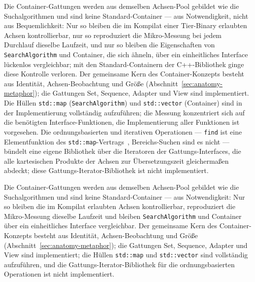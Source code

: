 \begin{nurlang}
Die Container-Gattungen werden aus demselben Achsen-Pool gebildet wie die Suchalgorithmen und sind keine
Standard-Container --- aus Notwendigkeit, nicht aus Bequemlichkeit: Nur so bleiben die im Kompilat einer
Tier-Binary erlaubten Achsen kontrollierbar, nur so reproduziert die Mikro-Messung bei jedem Durchlauf
dieselbe Laufzeit, und nur so bleiben die Eigenschaften von \texttt{SearchAlgorithm} und Container, die
sich ähneln, über ein einheitliches Interface lückenlos vergleichbar; mit den Standard-Containern der
C++-Bibliothek ginge diese Kontrolle verloren. Der gemeinsame Kern des Container-Konzepts besteht aus
Identität, Achsen-Beobachtung und Größe (Abschnitt~\ref{sec:anatomy-metaphor}); die Gattungen Set, Sequence,
Adapter und View sind implementiert. Die Hüllen \texttt{std::map} (\texttt{SearchAlgorithm}) und
\texttt{std::vector} (Container) sind in der Implementierung vollständig aufzuführen; die Messung
konzentriert sich auf die benötigten Interface-Funktionen, die Implementierung aller Funktionen ist
vorgesehen. Die ordnungsbasierten und iterativen Operationen --- \texttt{find} ist eine
Elementfunktion des \texttt{std::map}-Vertrags~\cite{iso_cpp}, Bereichs-Suchen sind es nicht ---
bündelt eine eigene Bibliothek über die Iteratoren der Gattungs-Interfaces, die alle kartesischen Produkte
der Achsen zur Übersetzungszeit gleichermaßen abdeckt; diese Gattungs-Iterator-Bibliothek ist nicht implementiert.
\end{nurlang}
\begin{nurkurz}
Die Container-Gattungen werden aus demselben Achsen-Pool gebildet wie die Suchalgorithmen und sind keine
Standard-Container --- aus Notwendigkeit: Nur so bleiben die im Kompilat erlaubten Achsen kontrollierbar,
reproduziert die Mikro-Messung dieselbe Laufzeit und bleiben \texttt{SearchAlgorithm} und Container über ein
einheitliches Interface vergleichbar. Der gemeinsame Kern des Container-Konzepts besteht aus Identität,
Achsen-Beobachtung und Größe (Abschnitt~\ref{sec:anatomy-metaphor}); die Gattungen Set, Sequence, Adapter und View
sind implementiert; die Hüllen \texttt{std::map} und \texttt{std::vector} sind vollständig aufzuführen, und die
Gattungs-Iterator-Bibliothek für die ordnungsbasierten Operationen ist nicht implementiert.
\end{nurkurz}

